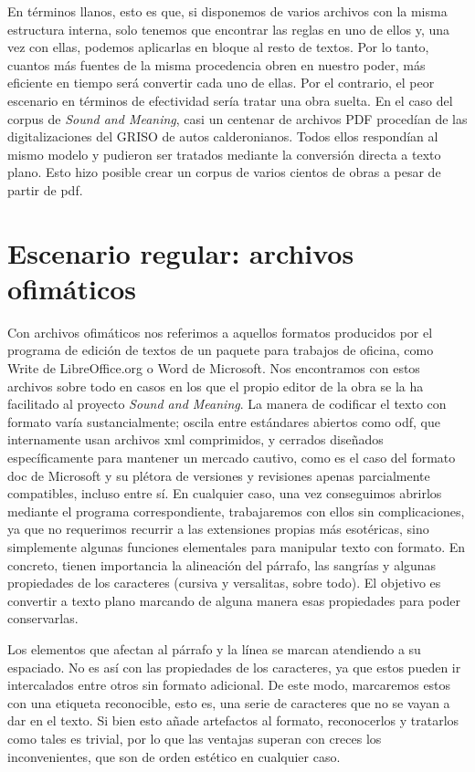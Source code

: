 En términos llanos, esto es que, si disponemos de varios archivos con la misma estructura interna, solo tenemos que encontrar las reglas en uno de ellos y, una vez con ellas, podemos aplicarlas en bloque al resto de textos. Por lo tanto, cuantos más fuentes de la misma procedencia obren en nuestro poder, más eficiente en tiempo será convertir cada uno de ellas. Por el contrario, el peor escenario en términos de efectividad sería tratar una obra suelta. En el caso del corpus de \textit{Sound and Meaning}, casi un centenar de archivos PDF procedían de las digitalizaciones del GRISO \parencite*{griso2020} de autos calderonianos. Todos ellos respondían al mismo modelo y pudieron ser tratados mediante la conversión directa a texto plano. Esto hizo posible crear un corpus de varios cientos de obras a pesar de partir de \ac{pdf}.

\section{Escenario regular: archivos ofimáticos}
Con archivos ofimáticos nos referimos a aquellos formatos producidos por el programa de edición de textos de un paquete para trabajos de oficina, como Write de LibreOffice.org o Word de Microsoft. Nos encontramos con estos archivos sobre todo en casos en los que el propio editor de la obra se la ha facilitado al proyecto \textit{Sound and Meaning}. La manera de codificar el texto con formato varía sustancialmente; oscila entre estándares abiertos como \ac{odf}, que internamente usan archivos \ac{xml} comprimidos, y cerrados diseñados específicamente para mantener un mercado cautivo, como es el caso del formato \ac{doc} de Microsoft y su plétora de versiones y revisiones apenas parcialmente compatibles, incluso entre sí. En cualquier caso, una vez conseguimos abrirlos mediante el programa correspondiente, trabajaremos con ellos sin complicaciones, ya que no requerimos recurrir a las extensiones propias más esotéricas, sino simplemente algunas funciones elementales para manipular texto con formato. En concreto, tienen importancia la alineación del párrafo, las sangrías y algunas propiedades de los caracteres (cursiva y versalitas, sobre todo). El objetivo es convertir a texto plano marcando de alguna manera esas propiedades para poder conservarlas.

Los elementos que afectan al párrafo y la línea se marcan atendiendo  a su espaciado. No es así con las propiedades de los caracteres, ya que estos pueden ir intercalados entre otros sin formato adicional. De este modo, marcaremos estos con una etiqueta reconocible, esto es, una serie de caracteres que no se vayan a dar en el texto. Si bien esto añade artefactos al formato, reconocerlos y tratarlos como tales es trivial, por lo que las ventajas superan con creces los inconvenientes, que son de orden estético en cualquier caso. 

